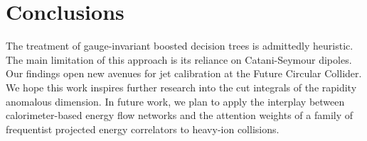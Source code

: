 \section{Conclusions}\label{sec:conclusions}

The treatment of gauge-invariant boosted decision trees is admittedly
heuristic. The main limitation of this approach is its reliance on
Catani-Seymour dipoles. Our findings open new avenues for jet
calibration at the Future Circular Collider. We hope this work inspires
further research into the cut integrals of the rapidity anomalous
dimension. In future work, we plan to apply the interplay between
calorimeter-based energy flow networks and the attention weights of a
family of frequentist projected energy correlators to heavy-ion
collisions.

